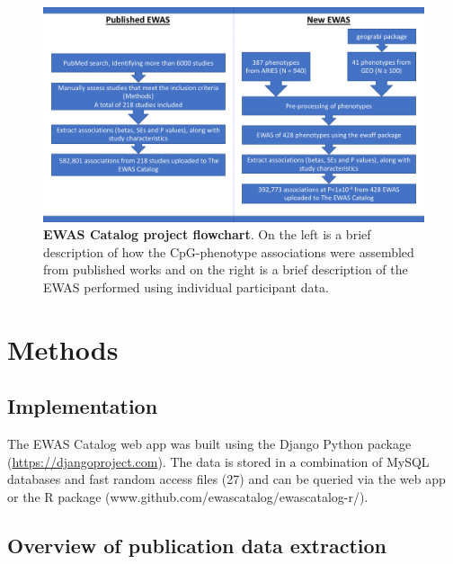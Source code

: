\documentclass[11pt,oneside]{bristolthesis}
\begin{document}
\begin{figure}

{\centering \includegraphics[width=1\linewidth]{figure/03-ewas_catalog/project_flowchart} 

}

\caption[EWAS Catalog project flowchart]{\textbf{EWAS Catalog project flowchart}. On the left is a brief description of how the CpG-phenotype associations were assembled from published works and on the right is a brief description of the EWAS performed using individual participant data.}\label{fig:catalog-project-workflow}
\end{figure}
\hypertarget{methods-03}{%
\section{Methods}\label{methods-03}}

\hypertarget{implementation}{%
\subsection{Implementation}\label{implementation}}

The EWAS Catalog web app was built using the Django Python package (\url{https://djangoproject.com}). The data is stored in a combination of MySQL databases and fast random access files (27) and can be queried via the web app or the R package (www.github.com/ewascatalog/ewascatalog-r/).

\hypertarget{overview-of-publication-data-extraction}{%
\subsection{Overview of publication data extraction}\label{overview-of-publication-data-extraction}}
\end{document}
